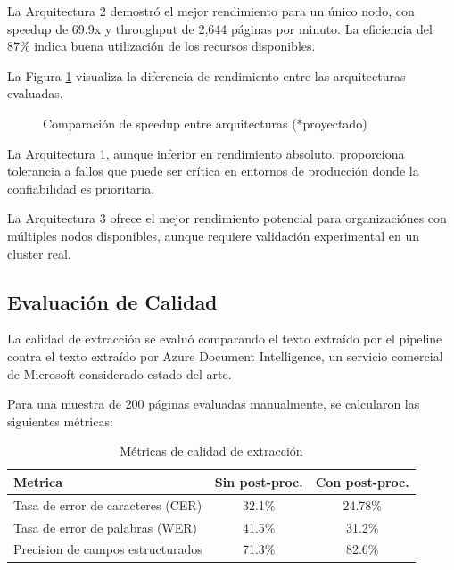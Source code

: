 \documentclass[12pt,a4paper,twoside]{book}
\begin{document}
La Arquitectura 2 demostró el mejor rendimiento para un único nodo, con speedup de 69.9x y throughput de 2,644 páginas por minuto. La eficiencia del 87\% indica buena utilización de los recursos disponibles.

La Figura \ref{fig:speedup_comparación} visualiza la diferencia de rendimiento entre las arquitecturas evaluadas.

\begin{figure}[h]
\centering
{}
\caption{Comparación de speedup entre arquitecturas (*proyectado)}
\label{fig:speedup_comparación}
\end{figure}

La Arquitectura 1, aunque inferior en rendimiento absoluto, proporciona tolerancia a fallos que puede ser crítica en entornos de producción donde la confiabilidad es prioritaria.

La Arquitectura 3 ofrece el mejor rendimiento potencial para organizaciónes con múltiples nodos disponibles, aunque requiere validación experimental en un cluster real.

\subsection{Evaluación de Calidad}

La calidad de extracción se evaluó comparando el texto extraído por el pipeline contra el texto extraído por Azure Document Intelligence, un servicio comercial de Microsoft considerado estado del arte.

Para una muestra de 200 páginas evaluadas manualmente, se calcularon las siguientes métricas:

\begin{table}[h]
\centering
\caption{Métricas de calidad de extracción}
\label{tab:calidad_extracción}
\begin{tabular}{lcc}
\toprule
\textbf{Metrica} & \textbf{Sin post-proc.} & \textbf{Con post-proc.} \\
\midrule
Tasa de error de caracteres (CER) & 32.1\% & 24.78\% \\
Tasa de error de palabras (WER) & 41.5\% & 31.2\% \\
Precision de campos estructurados & 71.3\% & 82.6\% \\
\bottomrule
\end{tabular}
\end{table}
\end{document}
